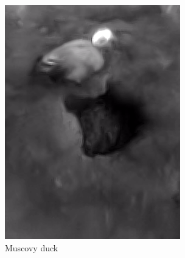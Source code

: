 \documentclass{l4proj}
\begin{document}
\begin{figure}[ht]
\begin{subfigure}[h!]{0.18\textwidth}
    \includegraphics[width=\textwidth, trim={0cm 1.6cm 0cm 1.6cm}, clip]{images/dataset/ugly_duck/lwir.png}
    \caption{Muscovy duck}
  \end{subfigure}
  \begin{subfigure}[h!]{0.18\textwidth}

\end{subfigure}
\end{figure}
\end{document}
